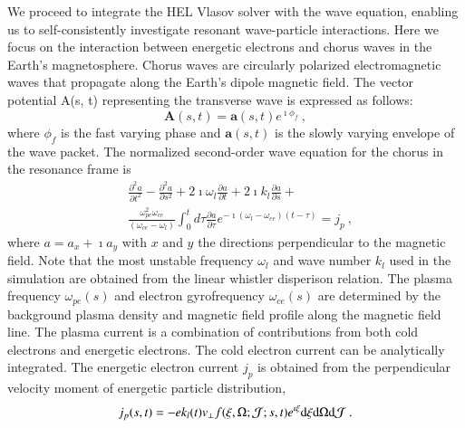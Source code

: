 \documentclass[times,12pt,3p,longtitle]{elsarticle}
\begin{document}
We proceed to integrate the HEL Vlasov solver with the wave equation, enabling us to self-consistently investigate resonant wave-particle interactions. Here we focus on the interaction between energetic electrons and chorus waves in the Earth's magnetosphere. Chorus waves are circularly polarized electromagnetic waves that propagate along the Earth's dipole magnetic field. The vector potential A(s, t) representing the transverse wave is expressed as follows:
\begin{equation}
    \mathbf{A}(s,t) = \mathbf{a}(s,t)e^{\imath \phi_f}~,
\end{equation}
where $\phi_f$ is the fast varying phase and $\mathbf{a}(s,t)$ is the slowly varying envelope of the wave packet. 
The normalized second-order wave equation for the chorus in the resonance frame  is 
\begin{equation}\label{eq.Wave}
    \begin{aligned}
        &\frac{\partial^2 a}{\partial t^2} - \frac{\partial^2 a}{\partial s^2} + {2\imath\omega_l}\frac{\partial a}{\partial t} + 2\imath k_l\frac{\partial a}{\partial s} + \\
        &\frac{\omega_{pe}^2 \omega_{ce}}{(\omega_{ce}-\omega_l)} \int_0^t d \tau \frac{\partial a}{\partial \tau} e^{-\imath\left(\omega_l-\omega_{c e}\right)(t-\tau)} = j_p~,
        \end{aligned}
      \end{equation}
where $a = a_x + \imath a_y$ with $x$ and $y$ the directions perpendicular to the  magnetic field. Note that the most unstable frequency $\omega_l$ and wave number $k_l$ used in the simulation are obtained from  the linear whistler disperison relation.
The plasma frequency $\omega_{pe}(s)$ and electron gyrofrequency $\omega_{ce}(s)$
are determined by the background plasma density and magnetic field profile along the magnetic field line.
The plasma current is a combination of contributions from both cold electrons and energetic electrons. The cold electron current can be analytically integrated. 
The energetic electron current $j_p$ is obtained from the perpendicular velocity moment of energetic particle distribution,
\begin{equation}
    j_p(s,t) = - 
ek_l(t)
    \iiint 
v_\perp
    f(\xi,\Omega;\mathcal{J};s,t) e^{\imath \xi} \rm d \xi \rm d \Omega \rm d \mathcal{J}~.
\end{equation}
\end{document}
